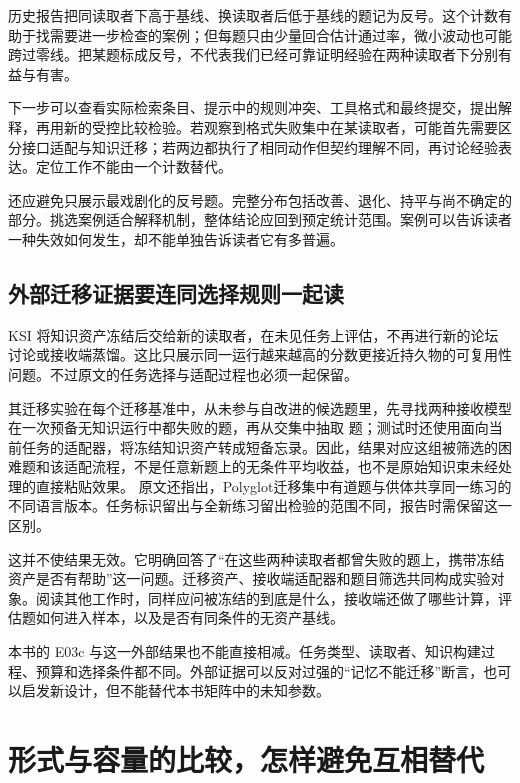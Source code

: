 历史报告把同读取者下高于基线、换读取者后低于基线的题记为反号。这个计数有助于找需要进一步检查的案例；但每题只由少量回合估计通过率，微小波动也可能跨过零线。把某题标成反号，不代表我们已经可靠证明经验在两种读取者下分别有益与有害。

下一步可以查看实际检索条目、提示中的规则冲突、工具格式和最终提交，提出解释，再用新的受控比较检验。若观察到格式失败集中在某读取者，可能首先需要区分接口适配与知识迁移；若两边都执行了相同动作但契约理解不同，再讨论经验表达。定位工作不能由一个计数替代。

还应避免只展示最戏剧化的反号题。完整分布包括改善、退化、持平与尚不确定的部分。挑选案例适合解释机制，整体结论应回到预定统计范围。案例可以告诉读者一种失效如何发生，却不能单独告诉读者它有多普遍。

\subsection{外部迁移证据要连同选择规则一起读}

KSI 将知识资产冻结后交给新的读取者，在未见任务上评估，不再进行新的论坛讨论或接收端蒸馏\cite{ksi-2607}。这比只展示同一运行越来越高的分数更接近持久物的可复用性问题。不过原文的任务选择与适配过程也必须一起保留。

其迁移实验在每个迁移基准中，从未参与自改进的候选题里，先寻找两种接收模型在一次预备无知识运行中都失败的题，再从交集中抽取  题；测试时还使用面向当前任务的适配器，将冻结知识资产转成短备忘录\cite{ksi-2607}。因此，结果对应这组被筛选的困难题和该适配流程，不是任意新题上的无条件平均收益，也不是原始知识束未经处理的直接粘贴效果。
原文还指出，Polyglot迁移集中有道题与供体共享同一练习的不同语言版本\cite{ksi-2607}。任务标识留出与全新练习留出检验的范围不同，报告时需保留这一区别。

这并不使结果无效。它明确回答了“在这些两种读取者都曾失败的题上，携带冻结资产是否有帮助”这一问题。迁移资产、接收端适配器和题目筛选共同构成实验对象。阅读其他工作时，同样应问被冻结的到底是什么，接收端还做了哪些计算，评估题如何进入样本，以及是否有同条件的无资产基线。

本书的 E03c 与这一外部结果也不能直接相减。任务类型、读取者、知识构建过程、预算和选择条件都不同。外部证据可以反对过强的“记忆不能迁移”断言，也可以启发新设计，但不能替代本书矩阵中的未知参数。

\section{形式与容量的比较，怎样避免互相替代}
\label{sec:ch05-form-capacity}

